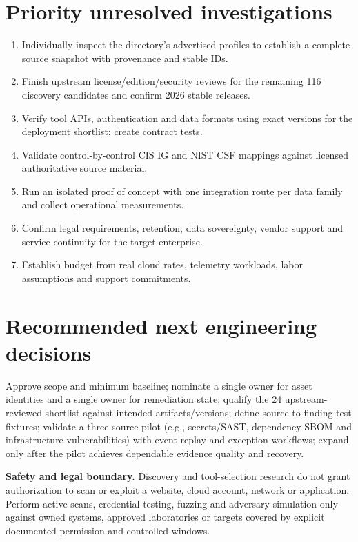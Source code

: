\documentclass[11pt,oneside]{report}
\begin{document}
\section{Priority unresolved investigations}
\begin{enumerate}[leftmargin=1.6em]
\item Individually inspect the directory's advertised profiles to establish a complete source snapshot with provenance and stable IDs.
\item Finish upstream license/edition/security reviews for the remaining 116 discovery candidates and confirm 2026 stable releases.
\item Verify tool APIs, authentication and data formats using exact versions for the deployment shortlist; create contract tests.
\item Validate control-by-control CIS IG and NIST CSF mappings against licensed authoritative source material.
\item Run an isolated proof of concept with one integration route per data family and collect operational measurements.
\item Confirm legal requirements, retention, data sovereignty, vendor support and service continuity for the target enterprise.
\item Establish budget from real cloud rates, telemetry workloads, labor assumptions and support commitments.
\end{enumerate}
\section{Recommended next engineering decisions}
Approve scope and minimum baseline; nominate a single owner for asset identities and a single owner for remediation state; qualify the 24 upstream-reviewed shortlist against intended artifacts/versions; define source-to-finding test fixtures; validate a three-source pilot (e.g., secrets/SAST, dependency SBOM and infrastructure vulnerabilities) with event replay and exception workflows; expand only after the pilot achieves dependable evidence quality and recovery.

\begin{caution}
\textbf{Safety and legal boundary.} Discovery and tool-selection research do not grant authorization to scan or exploit a website, cloud account, network or application. Perform active scans, credential testing, fuzzing and adversary simulation only against owned systems, approved laboratories or targets covered by explicit documented permission and controlled windows.
\end{caution}
\end{document}
